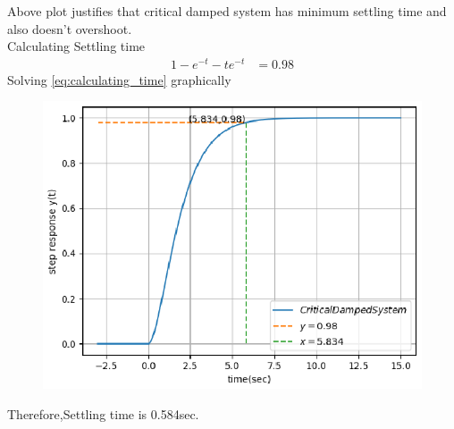 \begin{enumerate}[label=\thesubsection.\arabic*.,ref=\thesubsection.\theenumi]
Above plot justifies that critical damped system  has minimum settling time and also doesn't overshoot.\\
Calculating Settling time\\
\begin{align}
    \label{eq:calculating_time}
    1-e^{-t}-te^{-t}&=0.98
\end{align}
Solving \eqref{eq:calculating_time} graphically\\
\begin{figure}[!h]
\includegraphics[width=\columnwidth]{./figures/ee18btech11035_5.eps}
\caption{}
\label{fig:ee18btech11035_settling}
\end{figure}

Therefore,Settling time is 0.584sec.
\end{enumerate}
